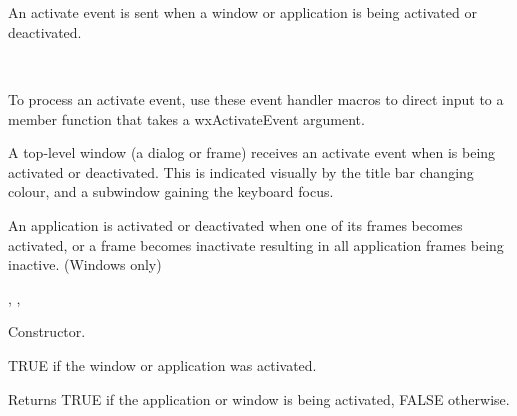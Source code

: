 \section{}\label{wxactivateevent}

An activate event is sent when a window or application is being activated
or deactivated.


\\


To process an activate event, use these event handler macros to direct input to a member
function that takes a wxActivateEvent argument.

\twocolwidtha{7cm}
\begin{twocollist}\itemsep=0pt
\end{twocollist}%


A top-level window (a dialog or frame) receives an activate event when is
being activated or deactivated. This is indicated visually by the title
bar changing colour, and a subwindow gaining the keyboard focus.

An application is activated or deactivated when one of its frames becomes activated,
or a frame becomes inactivate resulting in all application frames being inactive. (Windows only)


,\rtfsp
{},\rtfsp
{}




Constructor.



TRUE if the window or application was activated.

\label{wxactivateeventgetactive}


Returns TRUE if the application or window is being activated, FALSE otherwise.

